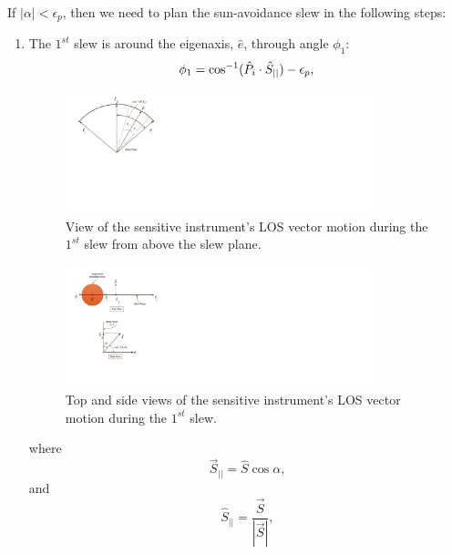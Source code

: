\documentclass[journal ]{new-aiaa}
\begin{document}
	If $|\alpha|<\epsilon_p$, then we need to plan the sun-avoidance slew in the following steps: 
	\begin{enumerate}[label=\Roman*)]
		\item The $1^{st}$ slew is around the eigenaxis, $\hat{e}$, through angle $\phi_1$:
		\begin{equation}\label{phi1_1}
		\phi_1 = \cos^{-1}(\hat{P}_i\cdot\hat{S}_{||})-\epsilon_p,\\
		\end{equation}
		\begin{figure}[H]
			\begin{center}
				\includegraphics[width=3.5in]{SVAS_1r_modified}
				\caption{View of the sensitive instrument's LOS vector motion during the $1^{st}$ slew from above the slew plane.}
			\end{center}
		\end{figure}
		\begin{figure}[h!]
			\centering
				\includegraphics[width=3.5in]{SVAS_1rb_modified}
				\caption{Top and side views of the sensitive instrument's LOS vector motion during the $1^{st}$ slew.}
		\end{figure}
		where 
		\begin{equation}\label{Sbar}
		\vec{S}_{||}=\hat{S}\cos\alpha, 
		\end{equation}
		and
		\begin{equation}\label{Shat}
		\hat{S}_{||}=\frac{\vec{S}}{|\vec{S}|},
		\end{equation}
	

\end{enumerate}
\end{document}
